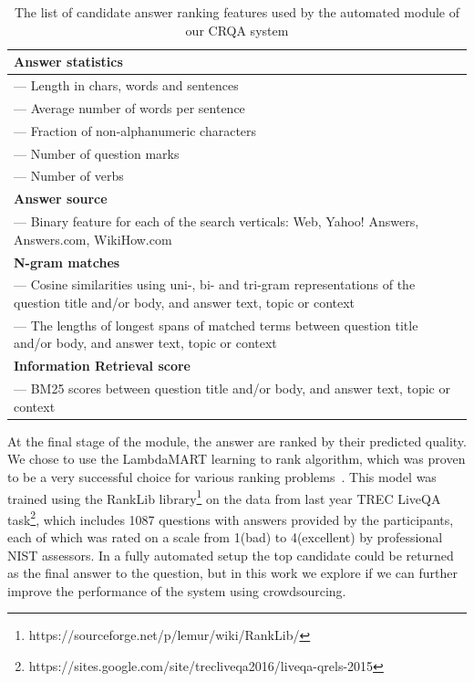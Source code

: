 \documentclass[letterpaper]{article}
\begin{document}
\begin{table}[ht]
\centering
\begin{tabular}{| p{8cm} |}
\hline
\textbf{Answer statistics} \\
\hline
--- Length in chars, words and sentences \\
--- Average number of words per sentence \\
--- Fraction of non-alphanumeric characters  \\
--- Number of question marks \\
--- Number of verbs  \\
\hline
\textbf{Answer source} \\
\hline
--- Binary feature for each of the search verticals: Web, Yahoo! Answers, Answers.com, WikiHow.com \\
\hline
\textbf{N-gram matches}\\
\hline
--- Cosine similarities using uni-, bi- and tri-gram representations of the question title and/or body, and answer text, topic or context\\
--- The lengths of longest spans of matched terms between question title and/or body, and answer text, topic or context\\
\hline
\textbf{Information Retrieval score}\\
\hline
--- BM25 scores between question title and/or body, and answer text, topic or context\\ 
\hline
\end{tabular}
\caption{The list of candidate answer ranking features used by the automated module of our CRQA system}
\label{table:features}
\end{table}

At the final stage of the module, the answer are ranked by their predicted quality.
We chose to use the LambdaMART learning to rank algorithm, which was proven to be a very successful choice for various ranking problems~\cite{burges2010ranknet}.
This model was trained using the RankLib library\footnote{https://sourceforge.net/p/lemur/wiki/RankLib/} on the data from last year TREC LiveQA task\footnote{https://sites.google.com/site/trecliveqa2016/liveqa-qrels-2015}, which includes 1087 questions with answers provided by the participants, each of which was rated on a scale from 1(bad) to 4(excellent) by professional NIST assessors.
In a fully automated setup the top candidate could be returned as the final answer to the question, but in this work we explore if we can further improve the performance of the system using crowdsourcing.
\end{document}
